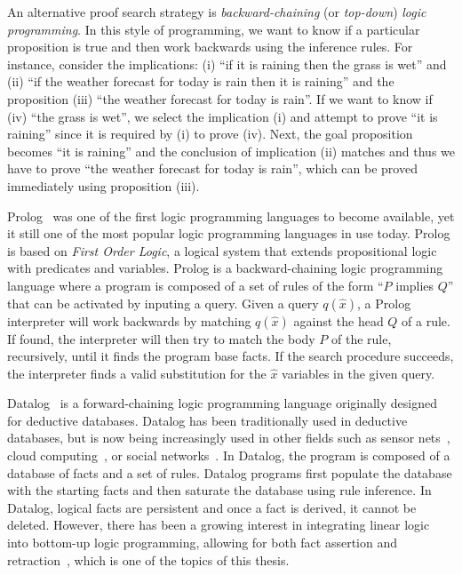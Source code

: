 An alternative proof search strategy is \emph{backward-chaining} (or
\emph{top-down}) \emph{logic programming}. In this style of programming, we want
to know if a particular proposition is true and then work backwards using the
inference rules. For instance, consider the implications: (i) ``if it is raining
then the grass is wet'' and (ii) ``if the weather forecast for today is rain then
it is raining'' and the proposition (iii) ``the weather forecast for today is
rain''. If we want to know if (iv) ``the grass is wet'', we select the
implication (i) and attempt to prove ``it is raining'' since it is required by
(i) to prove (iv). Next, the goal proposition becomes ``it
is raining'' and the conclusion of implication (ii) matches and thus we have to
prove ``the weather forecast for today is rain'', which can be proved
immediately using proposition (iii).

Prolog~\cite{Colmerauer:1993:BP:154766.155362} was one of the first logic
programming languages to become available, yet it still one of the most popular
logic programming languages in use today. Prolog is based on \emph{First Order
Logic}, a logical system that extends propositional logic with predicates and
variables. Prolog is a backward-chaining logic programming language where a
program is composed of a set of rules of the form ``$P$ implies $Q$'' that can be
activated by inputing a query.  Given a query $q(\hat{x})$, a Prolog interpreter
will work backwards by matching $q(\hat{x})$ against the head $Q$ of a rule. If
found, the interpreter will then try to match the body $P$ of the rule,
recursively, until it finds the program base facts. If the search procedure
succeeds, the interpreter finds a valid substitution for the $\hat{x}$ variables
in the given query.

Datalog~\cite{Ramakrishnan93asurvey,Ullman:1990:PDK:533142} is a
forward-chaining logic programming language originally designed for deductive
databases. Datalog has been traditionally used in deductive databases, but is
now being increasingly used in other fields such as sensor
nets~\cite{Chu:2007:DID:1322263.1322281}, cloud computing~\cite{alvaro:boom}, or
social networks~\cite{Seo:2013:DSD:2556549.2556572}.  In Datalog, the program is
composed of a database of facts and a set of rules.  Datalog programs first
populate the database with the starting facts and then saturate the database
using rule inference. In Datalog, logical facts are persistent and once a fact
is derived, it cannot be deleted. However, there has been a growing interest in
integrating linear logic~\cite{girard-87} into bottom-up logic programming,
allowing for both fact assertion and
retraction~\cite{Chang03ajudgmental,Lopez:2005:MCL:1069774.1069778,simmons-lla,cruz-iclp14},
which is one of the topics of this thesis.

